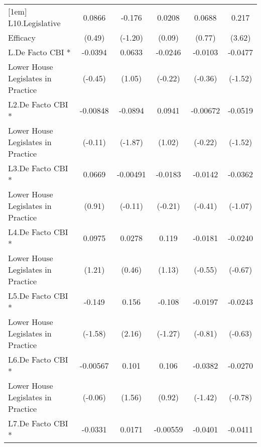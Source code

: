 {\begin{tabular}{l*{5}{c}}
[1em]
L10.Legislative     &      0.0866         &      -0.176         &      0.0208         &      0.0688         &       0.217\sym{***}\\
Efficacy            &      (0.49)         &     (-1.20)         &      (0.09)         &      (0.77)         &      (3.62)         \\
[1em]
L.De Facto CBI *    &     -0.0394         &      0.0633         &     -0.0246         &     -0.0103         &     -0.0477         \\
Lower House Legislates in Practice&     (-0.45)         &      (1.05)         &     (-0.22)         &     (-0.36)         &     (-1.52)         \\
[1em]
L2.De Facto CBI *   &    -0.00848         &     -0.0894         &      0.0941         &    -0.00672         &     -0.0519         \\
Lower House Legislates in Practice&     (-0.11)         &     (-1.87)         &      (1.02)         &     (-0.22)         &     (-1.52)         \\
[1em]
L3.De Facto CBI *   &      0.0669         &    -0.00491         &     -0.0183         &     -0.0142         &     -0.0362         \\
Lower House Legislates in Practice&      (0.91)         &     (-0.11)         &     (-0.21)         &     (-0.41)         &     (-1.07)         \\
[1em]
L4.De Facto CBI *   &      0.0975         &      0.0278         &       0.119         &     -0.0181         &     -0.0240         \\
Lower House Legislates in Practice&      (1.21)         &      (0.46)         &      (1.13)         &     (-0.55)         &     (-0.67)         \\
[1em]
L5.De Facto CBI *   &      -0.149         &       0.156\sym{*}  &      -0.108         &     -0.0197         &     -0.0243         \\
Lower House Legislates in Practice&     (-1.58)         &      (2.16)         &     (-1.27)         &     (-0.81)         &     (-0.63)         \\
[1em]
L6.De Facto CBI *   &    -0.00567         &       0.101         &       0.106         &     -0.0382         &     -0.0270         \\
Lower House Legislates in Practice&     (-0.06)         &      (1.56)         &      (0.92)         &     (-1.42)         &     (-0.78)         \\
[1em]
L7.De Facto CBI *   &     -0.0331         &      0.0171         &    -0.00559         &     -0.0401         &     -0.0411         \\

\end{tabular}}
